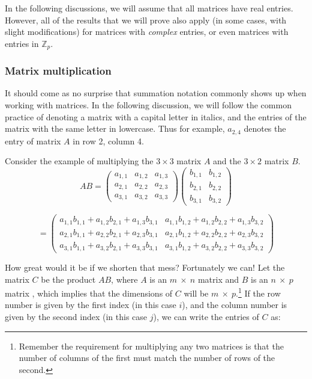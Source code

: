 In the following discussions, we will assume that all matrices have real entries.  However, all of the results that we will prove also apply (in some cases, with slight modifications)  for matrices with \emph{complex} entries, or even matrices with entries in $\mathbb{Z}_p$.

\subsubsection*{Matrix multiplication}
It should come as no surprise that summation notation commonly shows up when working with matrices. In the following discussion, we will follow the common practice of denoting a matrix with a capital letter in italics, and the entries of the matrix with the same letter in lowercase. Thus for example, $a_{2,4}$ denotes the entry of matrix $A$ in row 2, column 4.
   
 Consider the example of multiplying the $3 \times 3$ matrix $A$ and the $3 \times 2$ matrix $B$. 
\[{A}{B} = \left( \begin{array}{ccc}
a_{1,1} & a_{1,2}  & a_{1,3}  \\
a_{2,1} & a_{2,2} & a_{2,3} \\
a_{3,1} & a_{3,2} & a_{3,3} \end{array} \right)
 \left( \begin{array}{cc}
b_{1,1} & b_{1,2}    \\
b_{2,1} & b_{2,2}  \\
b_{3,1} & b_{3,2}  \end{array} \right) \]

\[= \left( \begin{array}{cc}
a_{1,1} b_{1,1} + a_{1,2} b_{2,1} + a_{1,3} b_{3,1} & a_{1,1} b_{1,2} + a_{1,2} b_{2,2} + a_{1,3} b_{3,2}  \\
a_{2,1} b_{1,1} + a_{2,2} b_{2,1} + a_{2,3} b_{3,1} & a_{2,1} b_{1,2} + a_{2,2} b_{2,2} + a_{2,3} b_{3,2}  \\
a_{3,1} b_{1,1} + a_{3,2} b_{2,1} + a_{3,3} b_{3,1} & a_{3,1} b_{1,2} + a_{3,2} b_{2,2} + a_{3,3} b_{3,2}  \end{array} \right) \]

How great would it be if we shorten that mess?  Fortunately we can!  Let the matrix ${C}$ be the product ${A} {B}$, where ${A}$ is an $m ~\times ~n$ matrix  and ${B}$ is an $n ~\times ~p$ matrix , which implies that the dimensions of ${C}$ will be $m ~ \times ~ p$.\footnote{Remember the requirement for multiplying any two matrices is that the number of columns of the first must match the number of rows of the second.}  If the row number is given by the first index (in this case $i$), and the column number is given by the second index (in this case $j$), we can write the entries of  ${C}$ as: 


